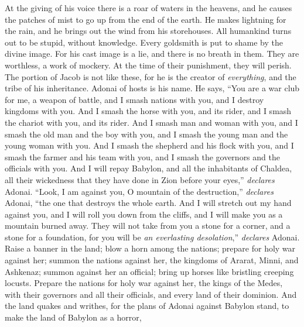 \begin{biblechapter}
\verse At the giving of his voice 
there is a roar of waters in the heavens, 
and he causes the patches of mist 
to go up from the end of the earth. 
He makes lightning for the rain, 
and he brings out the wind from his storehouses.
\verse All humankind turns out to be stupid, 
without knowledge. 
Every goldsmith is put to shame 
by the divine image. 
For his cast image is a lie, 
and there is no breath in them.
\verse They are worthless, 
a work of mockery. 
At the time of their punishment, 
they will perish.
\verse The portion of Jacob is not like these, 
for he is the creator of \textit{everything}, 
and the tribe of his inheritance. 
Adonai of hosts is his name.
\verse He says, “You are a war club for me, 
a weapon of battle, 
and I smash nations with you, 
and I destroy kingdoms with you.
\verse And I smash the horse with you, 
and its rider, 
and I smash the chariot with you, 
and its rider.
\verse And I smash man and woman with you, 
and I smash the old man and the boy with you, 
and I smash the young man and the young woman with you.
\verse And I smash the shepherd and his flock with you, 
and I smash the farmer and his team with you, 
and I smash the governors and the officials with you.
\verse And I will repay Babylon, 
and all the inhabitants of Chaldea, 
all their wickedness that they have done in Zion 
before your eyes,” \textit{declares} Adonai.
\verse “Look, I am against you, 
O mountain of the destruction,” \textit{declares} Adonai, 
“the one that destroys the whole earth. 
And I will stretch out my hand against you, 
and I will roll you down from the cliffs, 
and I will make you as a mountain burned away.
\verse They will not take from you 
a stone for a corner, 
and a stone for a foundation, 
for you will be \textit{an everlasting desolation},” \textit{declares} Adonai.
\verse Raise a banner in the land; 
blow a horn among the nations; 
prepare for holy war against her; 
summon the nations against her, 
the kingdoms of Ararat, Minni, and Ashkenaz; 
summon against her an official; 
bring up horses like bristling creeping locusts.
\verse Prepare the nations for holy war against her, 
the kings of the Medes, 
with their governors and all their officials, 
and every land of their dominion.
\verse And the land quakes and writhes, 
for the plans of Adonai against Babylon stand, 
to make the land of Babylon as a horror, 

\end{biblechapter}
